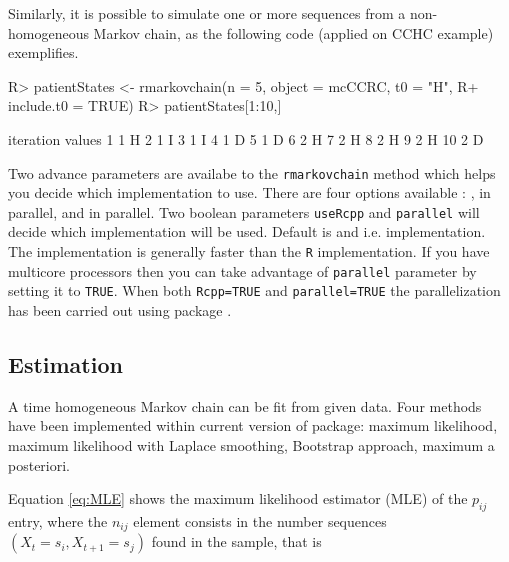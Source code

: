 \documentclass[
  nojss]{jss}
\begin{document}
Similarly, it is possible to simulate one or more sequences from a non-homogeneous Markov chain,
as the following code (applied on CCHC example) exemplifies.

\begin{CodeChunk}

\begin{CodeInput}
R> patientStates <- rmarkovchain(n = 5, object = mcCCRC, t0 = "H", 
R+                               include.t0 = TRUE)
R> patientStates[1:10,]
\end{CodeInput}

\begin{CodeOutput}
   iteration values
1          1      H
2          1      I
3          1      I
4          1      D
5          1      D
6          2      H
7          2      H
8          2      H
9          2      H
10         2      D
\end{CodeOutput}
\end{CodeChunk}

Two advance parameters are availabe to the \texttt{rmarkovchain} method which helps you decide which implementation to use. There are four options available : ,  in parallel,  and  in parallel. Two boolean parameters \texttt{useRcpp} and \texttt{parallel} will decide which implementation will be used. Default is  and  i.e.  implementation. The  implementation is generally faster than the \texttt{R} implementation. If you have multicore processors then you can take advantage of \texttt{parallel} parameter by setting it to \texttt{TRUE}. When both \texttt{Rcpp=TRUE} and \texttt{parallel=TRUE} the parallelization has been carried out using  package \citep{pkg:RcppParallel}.

\hypertarget{estimation}{%
\subsection{Estimation}\label{estimation}}

A time homogeneous Markov chain can be fit from given data. Four methods have been implemented within current version of  package: maximum likelihood, maximum likelihood with Laplace smoothing, Bootstrap approach, maximum a posteriori.

Equation \ref{eq:MLE} shows the maximum likelihood estimator (MLE) of the \(p_{ij}\) entry, where the \(n_{ij}\) element consists in the number sequences \(\left( X_{t}=s_{i}, X_{t+1}=s_{j}\right)\) found in the sample, that is
\end{document}
